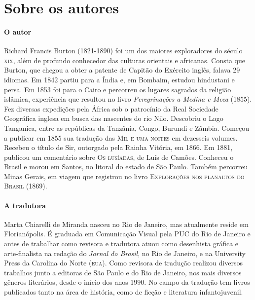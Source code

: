 \documentclass[11pt]{extarticle}
\begin{document}


\section{Sobre os autores}

\paragraph{O autor} Richard Francis Burton (1821-1890) foi um dos maiores
exploradores do século \textsc{xix}, além de profundo conhecedor das culturas orientais e africanas. Consta que Burton, que chegou a obter a patente de Capitão do Exército inglês, falava 29 idiomas. Em 1842 partiu para a Índia e, em Bombaim, estudou hindustani e persa. Em 1853 foi para o Cairo e percorreu os lugares sagrados da religião islâmica, experiência
que resultou no livro \textit{Peregrinações a Medina e Meca} (1855).
Fez diversas expedições pela África sob o patrocínio da Real Sociedade Geográfica inglesa em busca das nascentes do rio Nilo. Descobriu o Lago Tanganica, entre as repúblicas da
Tanzânia, Congo, Burundi e Zâmbia. Começou a publicar em 1855 sua tradução das \textsc{Mil e uma noites} em dezesseis volumes. Recebeu o título de Sir, outorgado pela Rainha Vitória,
em 1866. Em 1881, publicou um comentário sobre \textsc{Os lusíadas}, de Luís de Camões. Conheceu o Brasil e morou em Santos, no litoral do estado de São Paulo. Também percorreu
Minas Gerais, em viagem que registrou no livro \textsc{Explorações nos planaltos do Brasil} (1869).

\paragraph{A tradutora} Marta Chiarelli de Miranda nasceu no Rio de Janeiro, mas
atualmente reside em Florianópolis. É graduada em Comunicação Visual pela \textsc{PUC} do Rio de Janeiro e antes de trabalhar como revisora e tradutora atuou como desenhista gráfica e arte-finalista na redação do \textit{Jornal do Brasil}, no Rio de Janeiro, e na University Press da Carolina do Norte (\textsc{eua}). Como revisora de tradução realizou diversos trabalhos junto a editoras de São Paulo e do Rio de Janeiro, nos mais diversos gêneros literários, desde o início dos anos 1990. No campo da tradução tem livros publicados tanto na área de história, como de ficção e literatura infantojuvenil.
\end{document}
